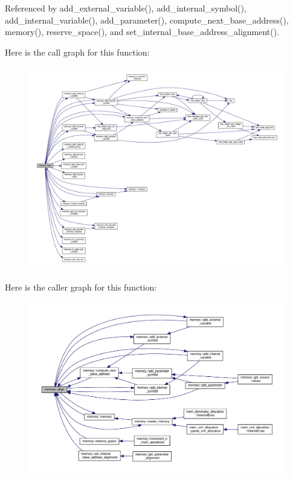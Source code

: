 Referenced by add\+\_\+external\+\_\+variable(), add\+\_\+internal\+\_\+symbol(), add\+\_\+internal\+\_\+variable(), add\+\_\+parameter(), compute\+\_\+next\+\_\+base\+\_\+address(), memory(), reserve\+\_\+space(), and set\+\_\+internal\+\_\+base\+\_\+address\+\_\+alignment().

Here is the call graph for this function\+:
\nopagebreak
\begin{figure}[H]
\begin{center}
\leavevmode
\includegraphics[width=350pt]{d8/d99/classmemory_a30018e73a41b777c95319b62cfc79b81_cgraph}
\end{center}
\end{figure}
Here is the caller graph for this function\+:
\nopagebreak
\begin{figure}[H]
\begin{center}
\leavevmode
\includegraphics[width=350pt]{d8/d99/classmemory_a30018e73a41b777c95319b62cfc79b81_icgraph}
\end{center}
\end{figure}
\mbox{\label{classmemory_aaa68bc383457b382d8fdac9d29d74def}} 
